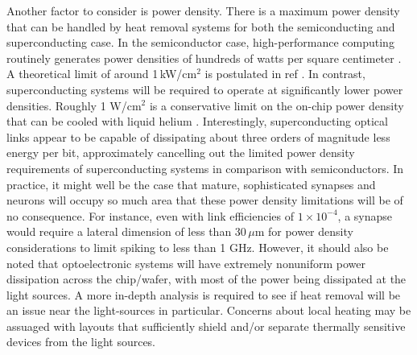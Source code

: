 \documentclass[twocolumn]{article}
\begin{document}
Another factor to consider is power density. There is a maximum power density that can be handled by heat removal systems for both the semiconducting and superconducting case. In the semiconductor case, high-performance computing routinely generates power densities of hundreds of watts per square centimeter \cite{tolpygo2016superconductor}. A theoretical limit of around 1\,kW/cm$^2$ is postulated in ref \cite{zhirnov2003limits}. In contrast, superconducting systems will be required to operate at significantly lower power densities. Roughly 1 W/cm$^2$ is a conservative limit on the on-chip power density that can be cooled with liquid helium \cite{tolpygo2016superconductor}. Interestingly, superconducting optical links appear to be capable of dissipating about three orders of magnitude less energy per bit, approximately cancelling out the limited power density requirements of superconducting systems in comparison with semiconductors. In practice, it might well be the case that mature, sophisticated synapses and neurons will occupy so much area that these power density limitations will be of no consequence. For instance, even with link efficiencies of $1 \times 10^{-4}$, a synapse would require a lateral dimension of less than 30\,$\mu$m for power density considerations to limit spiking to less than 1 GHz. However, it should also be noted that optoelectronic systems will have extremely nonuniform power dissipation across the chip/wafer, with most of the power being dissipated at the light sources. A more in-depth analysis is required to see if heat removal will be an issue near the light-sources in particular. Concerns about local heating may be assuaged with layouts that sufficiently shield and/or separate thermally sensitive devices from the light sources.
\end{document}
